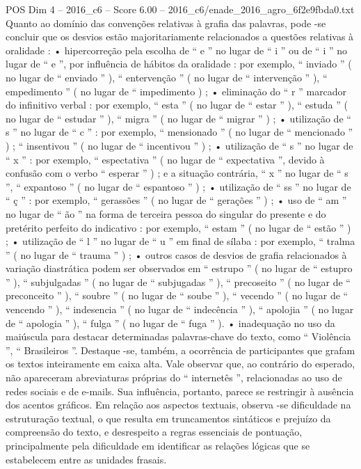 \begin{textsample}{POS Dim 4 – 2016\_c6 – Score 6.00 – 2016\_c6/enade\_2016\_agro\_6f2e9fbda0.txt}
Quanto ao domínio das convenções relativas à grafia das palavras, pode -se concluir que os desvios estão majoritariamente relacionados a questões relativas à oralidade : • hipercorreção pela escolha de “ e ” no lugar de “ i ” ou de “ i ” no lugar de “ e ”, por influência de hábitos da oralidade : por exemplo, “ inviado ” ( no lugar de “ enviado ” ), “ entervenção ” ( no lugar de “ intervenção ” ), “ empedimento ” ( no lugar de “ impedimento ) ; • eliminação do “ r ” marcador do infinitivo verbal : por exemplo, “ esta ” ( no lugar de “ estar ” ), “ estuda ” ( no lugar de “ estudar ” ), “ migra ” ( no lugar de “ migrar ” ) ; • utilização de “ s ” no lugar de “ c ” : por exemplo, “ mensionado ” ( no lugar de “ mencionado ” ) ; “ insentivou ” ( no lugar de “ incentivou ” ) ; • utilização de “ s ” no lugar de “ x ” : por exemplo, “ espectativa ” ( no lugar de “ expectativa ”, devido à confusão com o verbo “ esperar ” ) ; e a situação contrária, “ x ” no lugar de “ s ”, “ expantoso ” ( no lugar de “ espantoso ” ) ; • utilização de “ ss ” no lugar de “ ç ” : por exemplo, “ gerassões ” ( no lugar de “ gerações ” ) ; • uso de “ am ” no lugar de “ ão ” na forma de terceira pessoa do singular do presente e do pretérito perfeito do indicativo : por exemplo, “ estam ” ( no lugar de “ estão ” ) ; • utilização de “ l ” no lugar de “ u ” em final de sílaba : por exemplo, “ tralma ” ( no lugar de “ trauma ” ) ; • outros casos de desvios de grafia relacionados à variação diastrática podem ser observados em “ estrupo ” ( no lugar de “ estupro ” ), “ subjulgadas ” ( no lugar de “ subjugadas ” ), “ precoseito ” ( no lugar de “ preconceito ” ), “ soubre ” ( no lugar de “ soube ” ), “ vecendo ” ( no lugar de “ vencendo ” ), “ indesencia ” ( no lugar de “ indecência ” ), “ apolojia ” ( no lugar de “ apologia ” ), “ fulga ” ( no lugar de “ fuga ” ). • inadequação no uso da maiúscula para destacar determinadas palavras-chave do texto, como “ Violência ”, “ Brasileiros ”.
Destaque -se, também, a ocorrência de participantes que grafam os textos inteiramente em caixa alta.
Vale observar que, ao contrário do esperado, não apareceram abreviaturas próprias do “ internetês ”, relacionadas ao uso de redes sociais e de e-mails.
Sua influência, portanto, parece se restringir à ausência dos acentos gráficos.
Em relação aos aspectos textuais, observa -se dificuldade na estruturação textual, o que resulta em truncamentos sintáticos e prejuízo da compreensão do texto, e desrespeito a regras essenciais de pontuação, principalmente pela dificuldade em identificar as relações lógicas que se estabelecem entre as unidades frasais.

\end{textsample}
